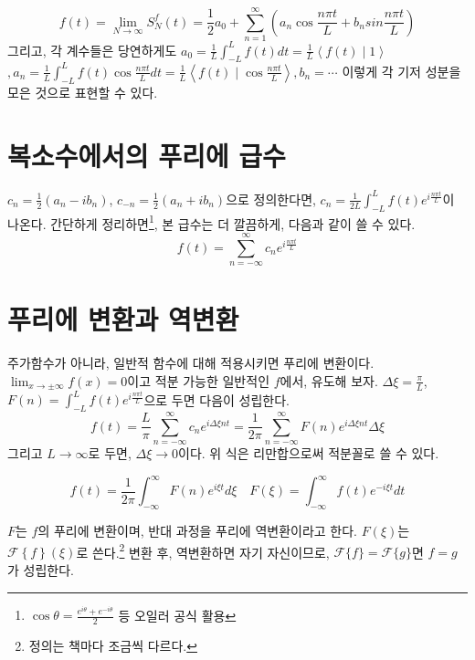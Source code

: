 \documentclass[article, oneside]{oblivoir}
\begin{document}
\begin{equation}
    f(t) = \lim_{N \to \infty} S_N^f (t) = \frac{1}{2} a_0 + \sum_{n=1}^{\infty} \left( a_n \cos \frac{n \pi t}{L} + b_n sin \frac{n \pi t}{L}\right)
\end{equation}
그리고, 각 계수들은 당연하게도
$a_0 = \frac{1}{L} \int_{-L}^{L} f(t)dt
= \frac{1}{L} \left\langle f(t) \mid 1\right\rangle$$
, a_n = \frac{1}{L} \int_{-L}^{L} f(t) \cos\frac{n \pi t}{L}dt 
=\frac{1}{L} \left\langle f(t) \mid \cos\frac{n \pi t}{L}\right\rangle, b_n = \cdots$ 이렇게 각 기저 성분을 모은 것으로 표현할 수 있다.

\section{복소수에서의 푸리에 급수}
$c_n = \frac{1}{2}\left(a_n - ib_n\right)$, $c_{-n} = \frac{1}{2}\left(a_n + ib_n\right)$으로 정의한다면, $c_n = \frac{1}{2L}\int_{-L}^{L} f(t)e^{i\frac{n \pi t}{L}}$이 나온다. 간단하게 정리하면\footnote{$\cos \theta = \frac{e^{i \theta} + e^{-i \theta}}{2}$ 등 오일러 공식 활용}, 본 급수는 더 깔끔하게, 다음과 같이 쓸 수 있다.
\begin{equation}
    f(t) = \sum_{n=-\infty}^{\infty} c_n e^{i \frac{n \pi t}{L}}
\end{equation}

\section{푸리에 변환과 역변환}

주가함수가 아니라, 일반적 함수에 대해 적용시키면 푸리에 변환이다. $\lim_{x \to \pm \infty}f(x)=0$이고 적분 가능한 일반적인 $f$에서, 유도해 보자.
$\Delta \xi = \frac{\pi}{L}$, $F(n) = \int_{-L}^{L} f(t)e^{i\frac{n \pi t}{L}}$으로 두면 다음이 성립한다. 
$$f(t) = \frac{L}{\pi} \sum_{n=-\infty}^{\infty} c_n e^{i \Delta \xi n t} = \frac{1}{2\pi} \sum_{n=-\infty}^{\infty} F(n) e^{i  \Delta \xi n t} \Delta \xi$$
그리고 $L \to \infty$로 두면, $\Delta \xi \to 0$이다. 위 식은 리만합으로써 적분꼴로 쓸 수 있다.

\begin{equation}
    f(t) = \frac{1}{2\pi} \int_{-\infty}^{\infty} F(n) e^{i \xi t}d\xi \quad F(\xi) = \int_{-\infty}^{\infty} f(t)e^{-i \xi t}dt
\end{equation}

$F$는 $f$의 푸리에 변환이며, 반대 과정을 푸리에 역변환이라고 한다. $F(\xi)$는 $\mathcal{F}\left\{f\right\}(\xi)$로 쓴다.\footnote{정의는 책마다 조금씩 다르다.} 변환 후, 역변환하면 자기 자신이므로, $\mathcal{F}\{f\} = \mathcal{F}\{g\}$면 $f=g$가 성립한다.
\end{document}
